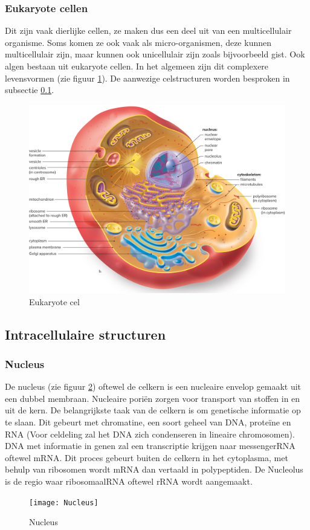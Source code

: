 \documentclass[a4paper,kul]{kulakarticle} %
\begin{document}
\subsubsection{Eukaryote cellen}
Dit zijn vaak dierlijke cellen, ze maken dus een deel uit van een multicellulair organisme. Soms komen ze ook vaak als micro-organismen, deze kunnen multicellulair zijn, maar kunnen ook unicellulair zijn zoals bijvoorbeeld gist. Ook algen bestaan uit eukaryote cellen. In het algemeen zijn dit complexere levensvormen (zie figuur \ref{fig:eukaryotecel}). De aanwezige celstructuren worden besproken in subsectie \ref{sec:IntracellulaireStructuren}. 
\begin{figure}[h]
	\centering
	\includegraphics[width=0.5\linewidth]{Eukaryote_cel}
	\caption[Eukaryote cel]{Eukaryote cel}
	\label{fig:eukaryotecel}
\end{figure}

\subsection{Intracellulaire structuren}
\label{sec:IntracellulaireStructuren}
\subsubsection{Nucleus}
De nucleus (zie figuur \ref{fig:nucleus}) oftewel de celkern is een nucleaire envelop gemaakt uit een dubbel membraan. Nucleaire poriën zorgen voor transport van stoffen in en uit de kern. De belangrijkste taak van de celkern is om genetische informatie op te slaan. Dit gebeurt met chromatine, een soort geheel van DNA, proteïne en RNA (Voor celdeling zal het DNA zich condenseren in lineaire chromosomen). DNA met informatie in genen zal een transcriptie krijgen naar messengerRNA oftewel mRNA. Dit proces gebeurt buiten de celkern in het cytoplasma, met behulp van ribosomen wordt mRNA dan vertaald in polypeptiden. De Nucleolus is de regio waar ribosomaalRNA oftewel rRNA wordt aangemaakt.
\begin{figure}[h]
	\centering
	\texttt{[image: Nucleus]}
	\caption[Nucleus]{Nucleus}
	\label{fig:nucleus}
\end{figure}
\end{document}
